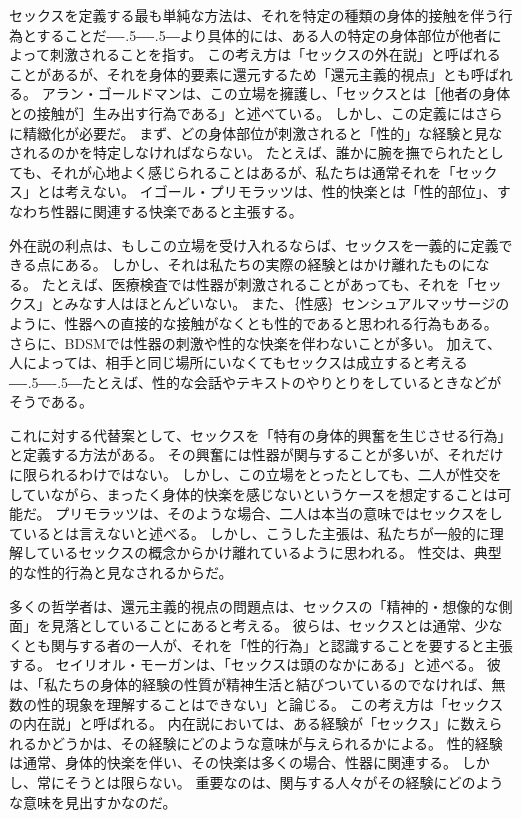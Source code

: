 \documentclass[paper=a4,book,openany]{jlreq}
\newcommand{\ig}[1]{}           %
\def\DDASH{―\kern-.5\zw―\kern-.5\zw―} %
\begin{document}
セックスを定義する最も単純な方法は、それを特定の種類の身体的接触を伴う行為とすることだ{\DDASH}より具体的には、ある人の特定の身体部位が他者によって刺激されることを指す。
この考え方は「セックスの外在説」と呼ばれることがあるが、それを身体的要素に還元するため「還元主義的視点」とも呼ばれる。
アラン・ゴールドマンは、この立場を擁護し、「セックスとは［他者の身体との接触が］生み出す行為である」と述べている\citep[p.268]{goldman77:_plain_sex}。\ig{Alan Goldman}
しかし、この定義にはさらに精緻化が必要だ。
まず、どの身体部位が刺激されると「性的」な経験と見なされるのかを特定しなければならない。
たとえば、誰かに腕を撫でられたとしても、それが心地よく感じられることはあるが、私たちは通常それを「セックス」とは考えない。
イゴール・プリモラッツは、性的快楽とは「性的部位」、すなわち性器に関連する快楽であると主張する\citep[p.46]{primoratz99:_ethic_and_sex}。

外在説の利点は、もしこの立場を受け入れるならば、セックスを一義的に定義できる点にある。
しかし、それは私たちの実際の経験とはかけ離れたものになる。
たとえば、医療検査では性器が刺激されることがあっても、それを「セックス」とみなす人はほとんどいない。
また、｛性感｝{センシュアル}マッサージのように、性器への直接的な接触がなくとも性的であると思われる行為もある。
さらに、BDSMでは性器の刺激や性的な快楽を伴わないことが多い。
加えて、人によっては、相手と同じ場所にいなくてもセックスは成立すると考える{\DDASH}たとえば、性的な会話やテキストのやりとりをしているときなどがそうである\citep[pp.19--20]{soble06:_activ_sexual}。

これに対する代替案として、セックスを「特有の身体的興奮を生じさせる行為」と定義する方法がある。
その興奮には性器が関与することが多いが、それだけに限られるわけではない\citep{janssen02:_sexual_inhib_sis1,janssen02:_sexual_inhib_sis2}。
しかし、この立場をとったとしても、二人が性交をしていながら、まったく身体的快楽を感じないというケースを想定することは可能だ。
プリモラッツは、そのような場合、二人は本当の意味ではセックスをしているとは言えないと述べる\citep[pp.47--49]{primoratz99:_ethic_and_sex}。
しかし、こうした主張は、私たちが一般的に理解しているセックスの概念からかけ離れているように思われる。
性交は、典型的な性的行為と見なされるからだ。

多くの哲学者は、還元主義的視点の問題点は、セックスの「精神的・想像的な側面」を見落としていることにあると考える。
彼らは、セックスとは通常、少なくとも関与する者の一人が、それを「性的行為」と認識することを要すると主張する。
セイリオル・モーガン\ig{セイリオル・モーガン}は、「セックスは頭のなかにある」と述べる。
彼は、「私たちの身体的経験の性質が精神生活と結びついているのでなければ、無数の性的現象を理解することはできない」と論じる\citep[p.5]{morgan03:_sex_in_head}。
この考え方は「セックスの内在説」と呼ばれる。
内在説においては、ある経験が「セックス」に数えられるかどうかは、その経験にどのような意味が与えられるかによる。
性的経験は通常、身体的快楽を伴い、その快楽は多くの場合、性器に関連する。
しかし、常にそうとは限らない。
重要なのは、関与する人々がその経験にどのような意味を見出すかなのだ。
\end{document}
